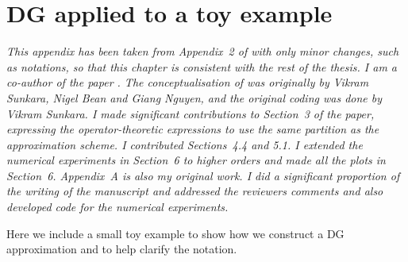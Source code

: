 \chapter{DG applied to a toy example}\label{appendix:example}
\begin{center}
    \begin{minipage}{0.8\textwidth}
        \textit{This appendix has been taken from Appendix~2 of \cite{blnos2022} with only minor changes, such as notations, so that this chapter is consistent with the rest of the thesis. I am a co-author of the paper \cite{blnos2022}. The conceptualisation of \cite{blnos2022} was originally by Vikram Sunkara, Nigel Bean and Giang Nguyen, and the original coding was done by Vikram Sunkara. I made significant contributions to Section~3 of the paper, expressing the operator-theoretic expressions to use the same partition as the approximation scheme. I contributed Sections~4.4 and 5.1. I extended the numerical experiments in Section~6 to higher orders and made all the plots in Section~6. Appendix~A is also my original work. I did a significant proportion of the writing of the manuscript and addressed the reviewers comments and also developed code for the numerical experiments.
        }
    \end{minipage}
    \end{center}
\renewcommand\thefigure{\arabic{figure}}
Here we include a small toy example to show how we construct a DG approximation and to help clarify the notation. 

